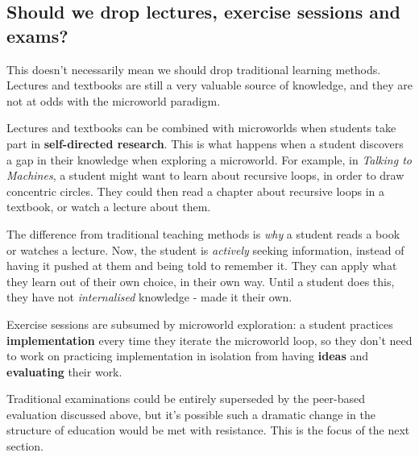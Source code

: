 \subsection{Should we drop lectures, exercise sessions and exams?}

This doesn't necessarily mean we should drop traditional learning
methods. Lectures and textbooks are still a very valuable source of
knowledge, and they are not at odds with the microworld paradigm.

Lectures and textbooks can be combined with microworlds when students
take part in \textbf{self-directed research}. This is what happens when
a student discovers a gap in their knowledge when exploring a
microworld. For example, in \emph{Talking to Machines}, a student might
want to learn about recursive loops, in order to draw concentric
circles. They could then read a chapter about recursive loops in a
textbook, or watch a lecture about them.

The difference from traditional teaching methods is \emph{why} a student
reads a book or watches a lecture. Now, the student is \emph{actively}
seeking information, instead of having it pushed at them and being told
to remember it. They can apply what they learn out of their own choice,
in their own way. Until a student does this, they have not
\emph{internalised} knowledge - made it their own.

Exercise sessions are subsumed by microworld exploration: a student
practices \textbf{implementation} every time they iterate the microworld
loop, so they don't need to work on practicing implementation in
isolation from having \textbf{ideas} and \textbf{evaluating} their work.

Traditional examinations could be entirely superseded by the peer-based
evaluation discussed above, but it's possible such a dramatic change in
the structure of education would be met with resistance. This is the
focus of the next section.

